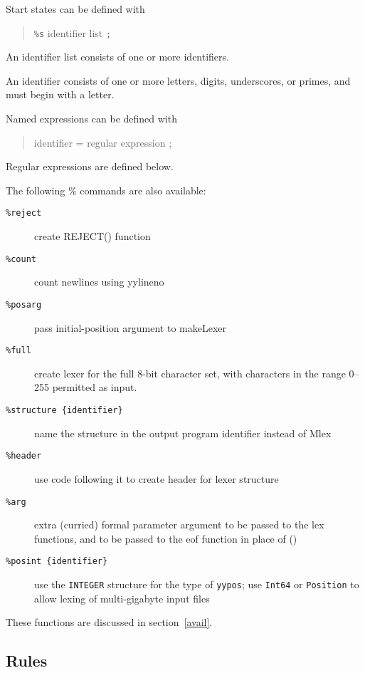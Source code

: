 Start states can be defined with
\begin{quote}
\verb|%s| {identifier list} \verb|;|
\end{quote}

An identifier list consists of one or more identifiers.

An identifier consists of one or more letters, digits, underscores,
or primes, and must begin with a letter.

Named expressions can be defined with

\begin{quote}
        {identifier} = {regular expression} ;
\end{quote}

Regular expressions are defined below.

The following \% commands are also available:

\begin{description}
\item[\tt \%reject]     create REJECT() function
\item[\tt \%count]      count newlines using yylineno
\item[\tt \%posarg]     pass initial-position argument to makeLexer
\item[\tt \%full]       create lexer for the full 8-bit character set,
                          with characters in the range 0--255 permitted
                          as input.
\item[\tt \%structure \{identifier\}]  name the structure in the output program
                          {identifier} instead of Mlex
\item[\tt \%header]     use code following it to create header for lexer
                          structure
\item[\tt \%arg]       extra (curried) formal parameter argument to be
                          passed to the lex functions, and to be passed
                          to the eof function in place of ()
\item[\tt \%posint \{identifier\}]  use the {\tt INTEGER} structure for the
                          type of {\tt yypos}; use {\tt Int64} or {\tt Position}
                          to allow lexing of multi-gigabyte input files
\end{description}
        These functions are discussed in section~\ref{avail}.

\subsection{Rules}

